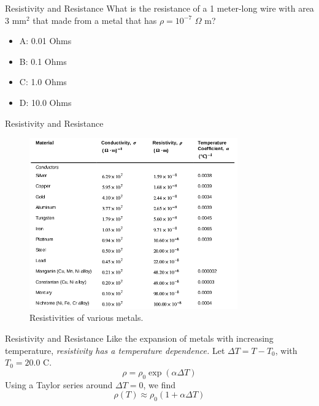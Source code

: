 \documentclass{beamer}
\begin{document}
\begin{frame}{Resistivity and Resistance}
What is the resistance of a 1 meter-long wire with area 3 mm$^2$ that made from a metal that has $\rho = 10^{-7}$ $\Omega$ m?
\begin{itemize}
\item A: 0.01 Ohms
\item B: 0.1 Ohms
\item C: 1.0 Ohms
\item D: 10.0 Ohms
\end{itemize}
\end{frame}

\begin{frame}{Resistivity and Resistance}
\begin{figure}
\centering
\includegraphics[width=0.8\textwidth]{figures/resist.png}
\caption{\label{fig:resist} Resistivities of various metals.}
\end{figure}
\end{frame}

\begin{frame}{Resistivity and Resistance}
Like the expansion of metals with increasing temperature, \textit{resistivity has a temperature dependence.}  Let $\Delta T = T - T_0$, with $T_0 = 20.0$ C.
\begin{equation}
\rho = \rho_0 \exp \left( \alpha \Delta T \right)
\end{equation}
Using a Taylor series around $\Delta T = 0$, we find
\begin{equation}
\rho(T) \approx \rho_0 \left(1 + \alpha \Delta T \right)
\end{equation}
\end{frame}
\end{document}
